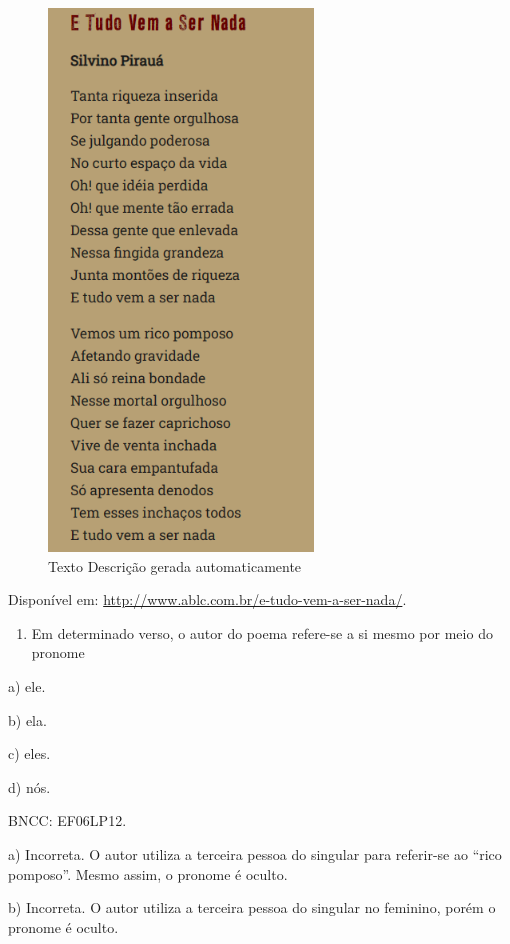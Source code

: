 {\begin{figure}
\centering
\includegraphics[width=2.77524in,height=5.66716in]{./imgSAEB_6_POR/media/image49.png}
\caption{Texto Descrição gerada automaticamente}
\end{figure}

Disponível em: \url{http://www.ablc.com.br/e-tudo-vem-a-ser-nada/}.

\begin{enumerate}
\def\labelenumi{\arabic{enumi}.}
\setcounter{enumi}{6}
\tightlist
\item
  Em determinado verso, o autor do poema refere-se a si mesmo por meio
  do pronome
\end{enumerate}

a) ele.

b) ela.

c) eles.

d) nós.

BNCC: EF06LP12.

a) Incorreta. O autor utiliza a terceira pessoa do singular para
referir-se ao ``rico pomposo''. Mesmo assim, o pronome é oculto.

b) Incorreta. O autor utiliza a terceira pessoa do singular no feminino,
porém o pronome é oculto.

}
